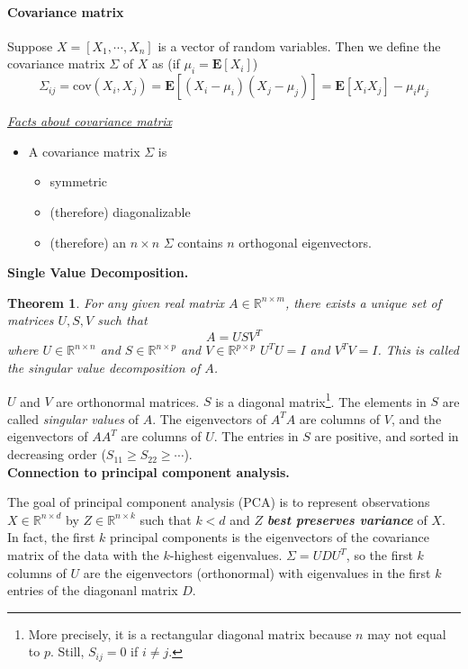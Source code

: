 \documentclass[12pt]{article}
\newcommand{\E}{\bm{E}}
\newtheorem{theorem}{Theorem}[section]
\theoremstyle{definition}
\begin{document}
\paragraph{Covariance matrix} Suppose $X=[X_1,\cdots,X_n]$ is a vector of random variables. Then we define the covariance matrix $\Sigma$ of $X$ as (if $\mu_i=\E[X_i]$)
\begin{equation}
  \Sigma_{ij}=\text{cov}(X_i, X_j)=\E[(X_i-\mu_i)(X_j-\mu_j)]=\E[X_iX_j]-\mu_i\mu_j
\end{equation}

\noindent\underline{\textit{Facts about covariance matrix}}
\begin{itemize}
\item A covariance matrix $\Sigma$ is
  \begin{itemize}
  \item symmetric
  \item (therefore) diagonalizable
  \item (therefore) an $n\times n$ $\Sigma$ contains $n$ orthogonal eigenvectors.
  \end{itemize}
\end{itemize}

\noindent \textbf{Single Value Decomposition.}

\begin{theorem}
  For any given real matrix $A\in\mathbb{R}^{n\times m}$, there exists a unique set of matrices $U, S, V$ such that
  \begin{equation}
    A = USV^T
  \end{equation}
  where $U\in\mathbb{R}^{n\times n}$ and $S\in\mathbb{R}^{n\times p}$ and $V\in\mathbb{R}^{p\times p}$ $U^TU=I$ and $V^TV=I$. This is called the \emph{singular value decomposition} of $A$.
\end{theorem}
$U$ and $V$ are orthonormal matrices. $S$ is a diagonal matrix\footnote{More precisely, it is a rectangular diagonal matrix because $n$ may not equal to $p$. Still, $S_{ij}=0$ if $i\neq j$.}. The elements in $S$ are called \emph{singular values} of $A$. The eigenvectors of $A^TA$ are columns of $V$, and the eigenvectors of $AA^T$ are columns of $U$. The entries in $S$ are positive, and sorted in decreasing order ($S_{11}\geq S_{22}\geq\cdots$).\\

\noindent\textbf{Connection to principal component analysis.}

The goal of principal component analysis (PCA) is to represent observations $X\in\mathbb{R}^{n\times d}$ by $Z\in\mathbb{R}^{n\times k}$ such that $k<d$ and $Z$ \textbf{\emph{best preserves variance}} of $X$. In fact, the first $k$ principal components is the eigenvectors of the covariance matrix of the data with the $k$-highest eigenvalues. $\Sigma=UDU^T$, so the first $k$ columns of $U$ are the eigenvectors (orthonormal) with eigenvalues in the first $k$ entries of the diagonanl matrix $D$.

\end{document}
